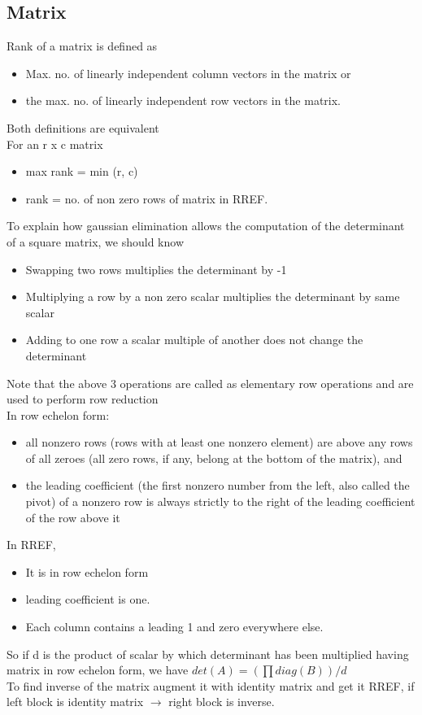 \documentclass[8pt, a4paper, oneside, twocolumn]{extarticle}
\begin{document}
\subsection{Matrix}
Rank of a matrix is defined as 
\begin{itemize}
    \item Max. no. of linearly independent column vectors in the matrix or
    \item the max. no. of linearly independent row vectors in the matrix.
\end{itemize}
Both definitions are equivalent
\\For an r x c matrix
\begin{itemize}
    \item max rank = min (r, c)
    \item rank = no. of non zero rows of matrix in RREF.
\end{itemize}
To explain how gaussian elimination allows the computation of the determinant of a square matrix, we should know
\begin{itemize}
    \item Swapping two rows multiplies the determinant by -1
    \item Multiplying a row by a non zero scalar multiplies the determinant by same scalar
    \item Adding to one row a scalar multiple of another does not change the determinant
\end{itemize}
Note that the above 3 operations are called as elementary row operations and are used to perform row reduction
\\In row echelon form:
\begin{itemize}
    \item all nonzero rows (rows with at least one nonzero element) are above any rows of all zeroes (all zero rows, if any, belong at the bottom of the matrix), and
    \item the leading coefficient (the first nonzero number from the left, also called the pivot) of a nonzero row is always strictly to the right of the leading coefficient of the row above it
\end{itemize}
In RREF, 
\begin{itemize}
    \item It is in row echelon form
    \item leading coefficient is one.
    \item Each column contains a leading 1 and zero everywhere else.
\end{itemize}
So if d is the product of scalar by which determinant has been multiplied having matrix in row echelon form, we have $det(A) = (\prod diag(B))/d$
\\To find inverse of the matrix augment it with identity matrix and get it RREF, if left block is identity matrix $\rightarrow$ right block is inverse. 
\end{document}
